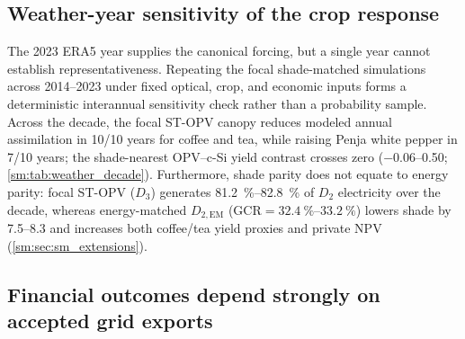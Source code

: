 \documentclass[preprint,12pt,a4paper]{elsarticle}
\begin{document}
\subsection{Weather-year sensitivity of the crop response}
\label{sec:weather_year_sensitivity}

The 2023 ERA5 year supplies the canonical forcing, but a single year cannot establish representativeness. Repeating the focal shade-matched simulations across 2014--2023 under fixed optical, crop, and economic inputs forms a deterministic interannual sensitivity check rather than a probability sample. Across the decade, the focal ST-OPV canopy reduces modeled annual assimilation in 10/10 years for coffee and tea, while raising Penja white pepper in 7/10 years; the shade-nearest OPV--c-Si yield contrast crosses zero (\qtyrange{-0.06}{+0.50}{\pp}; \cref{sm:tab:weather_decade}). Furthermore, shade parity does not equate to energy parity: focal ST-OPV ($D_3$) generates \qtyrange{81.2}{82.8}{\percent} of $D_2$ electricity over the decade, whereas energy-matched $D_{2,\mathrm{EM}}$ ($\mathrm{GCR}=\qtyrange{32.4}{33.2}{\percent}$) lowers shade by \qtyrange{7.5}{8.3}{\pp} and increases both coffee/tea yield proxies and private NPV (\cref{sm:sec:sm_extensions}).

\subsection{Financial outcomes depend strongly on accepted grid exports}
\label{sec:export_acceptance}
\end{document}
